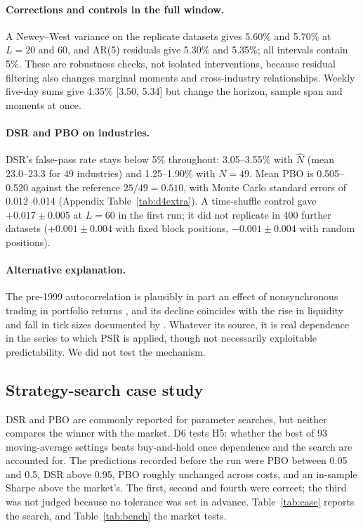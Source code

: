 \documentclass[11pt,a4paper]{article}
\begin{document}
\paragraph{Corrections and controls in the full window.} A Newey--West variance on the replicate datasets gives 5.60\% and 5.70\% at $L=20$ and 60, and AR(5) residuals give 5.30\% and 5.35\%; all intervals contain 5\%. These are robustness checks, not isolated interventions, because residual filtering also changes marginal moments and cross-industry relationships. Weekly five-day sums give 4.35\% [3.50, 5.34] but change the horizon, sample span and moments at once.

\paragraph{DSR and PBO on industries.} DSR's false-pass rate stays below 5\% throughout: 3.05--3.55\% with $\hat N$ (mean 23.0--23.3 for 49 industries) and 1.25--1.90\% with $N=49$. Mean PBO is 0.505--0.520 against the reference $25/49=0.510$, with Monte Carlo standard errors of 0.012--0.014 (Appendix Table~\ref{tab:d4extra}). A time-shuffle control gave $+0.017\pm0.005$ at $L=60$ in the first run; it did not replicate in 400 further datasets ($+0.001\pm0.004$ with fixed block positions, $-0.001\pm0.004$ with random positions).

\paragraph{Alternative explanation.} The pre-1999 autocorrelation is plausibly in part an effect of nonsynchronous trading in portfolio returns \citep{lo1990}, and its decline coincides with the rise in liquidity and fall in tick sizes documented by \citet{chordia2005,chordia2008}. Whatever its source, it is real dependence in the series to which PSR is applied, though not necessarily exploitable predictability. We did not test the mechanism.

\subsection{Strategy-search case study}\label{sec:res:case}

DSR and PBO are commonly reported for parameter searches, but neither compares the winner with the market. D6 tests H5: whether the best of 93 moving-average settings beats buy-and-hold once dependence and the search are accounted for. The predictions recorded before the run were PBO between 0.05 and 0.5, DSR above 0.95, PBO roughly unchanged across costs, and an in-sample Sharpe above the market's. The first, second and fourth were correct; the third was not judged because no tolerance was set in advance. Table~\ref{tab:case} reports the search, and Table~\ref{tab:bench} the market tests.
\end{document}
